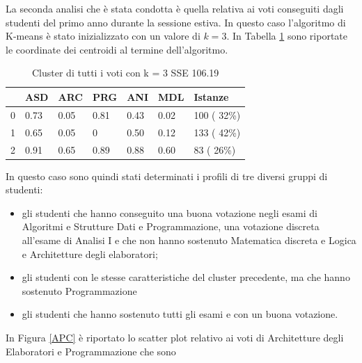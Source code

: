 \documentclass[12pt]{article}
\begin{document}
La seconda analisi che è stata condotta è quella relativa ai voti conseguiti dagli studenti del primo anno durante la sessione estiva. In questo caso l'algoritmo di K-means è stato inizializzato con un valore di $k=3$.
In Tabella \ref{c3V} sono riportate le coordinate dei centroidi al termine dell'algoritmo. 
\begin{table}[ht]
	\centering
	\begin{tabular}{@{}lllllll@{}}
	\toprule
	  & ASD  & ARC  & PRG & ANI  & MDL  & Istanze      \\ \midrule
	0 & 0.73 & 0.05 & 0.81& 0.43 & 0.02 &  100  ( 32\%)\\
	1 & 0.65 & 0.05 & 0   & 0.50 & 0.12 &  133 ( 42\%) \\
	2 & 0.91 & 0.65 & 0.89& 0.88 & 0.60 &  83  ( 26\%) \\ \bottomrule
	\end{tabular}
	\caption{Cluster di tutti i voti con k = 3 SSE 106.19}
	\label{c3V}
\end{table}
In questo caso sono quindi stati determinati i profili di tre diversi gruppi di studenti:
\begin{itemize}
\item gli studenti che hanno conseguito una buona votazione negli esami di Algoritmi e Strutture Dati e Programmazione,
una votazione discreta all'esame di Analisi I e che non hanno sostenuto Matematica discreta e Logica e Architetture degli elaboratori;
\item gli studenti con le stesse caratteristiche del cluster precedente, ma che hanno sostenuto Programmazione
\item gli studenti che hanno sostenuto tutti gli esami e con un buona votazione.
\end{itemize}
In Figura \ref{APC} è riportato lo scatter plot relativo ai voti di Architetture degli Elaboratori e Programmazione che sono
\end{document}
